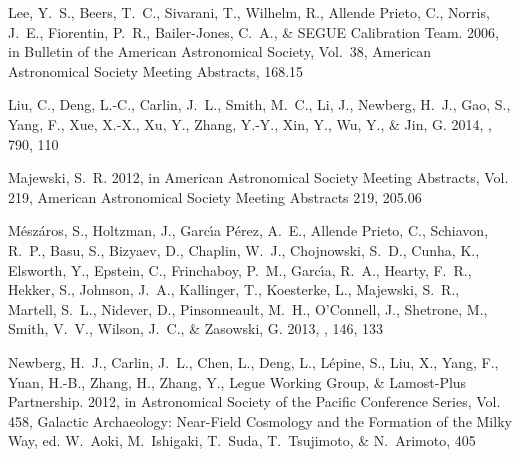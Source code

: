 \documentclass[12pt, preprint]{aastex}
\begin{document}
\begin{thebibliography}{24}
{Lee}, Y.~S., {Beers}, T.~C., {Sivarani}, T., {Wilhelm}, R., {Allende Prieto},
  C., {Norris}, J.~E., {Fiorentin}, P.~R., {Bailer-Jones}, C.~A., \& {SEGUE
  Calibration Team}. 2006, in Bulletin of the American Astronomical Society,
  Vol.~38, American Astronomical Society Meeting Abstracts, 168.15

{Liu}, C., {Deng}, L.-C., {Carlin}, J.~L., {Smith}, M.~C., {Li}, J., {Newberg},
  H.~J., {Gao}, S., {Yang}, F., {Xue}, X.-X., {Xu}, Y., {Zhang}, Y.-Y., {Xin},
  Y., {Wu}, Y., \& {Jin}, G. 2014, \apj, 790, 110

{Majewski}, S.~R. 2012, in American Astronomical Society Meeting Abstracts,
  Vol. 219, American Astronomical Society Meeting Abstracts 219, 205.06

{M{\'e}sz{\'a}ros}, S., {Holtzman}, J., {Garc{\'{\i}}a P{\'e}rez}, A.~E.,
  {Allende Prieto}, C., {Schiavon}, R.~P., {Basu}, S., {Bizyaev}, D.,
  {Chaplin}, W.~J., {Chojnowski}, S.~D., {Cunha}, K., {Elsworth}, Y.,
  {Epstein}, C., {Frinchaboy}, P.~M., {Garc{\'{\i}}a}, R.~A., {Hearty}, F.~R.,
  {Hekker}, S., {Johnson}, J.~A., {Kallinger}, T., {Koesterke}, L., {Majewski},
  S.~R., {Martell}, S.~L., {Nidever}, D., {Pinsonneault}, M.~H., {O'Connell},
  J., {Shetrone}, M., {Smith}, V.~V., {Wilson}, J.~C., \& {Zasowski}, G. 2013,
  \aj, 146, 133

{Newberg}, H.~J., {Carlin}, J.~L., {Chen}, L., {Deng}, L., {L{\'e}pine}, S.,
  {Liu}, X., {Yang}, F., {Yuan}, H.-B., {Zhang}, H., {Zhang}, Y., {Legue
  Working Group}, \& {Lamost-Plus Partnership}. 2012, in Astronomical Society
  of the Pacific Conference Series, Vol. 458, Galactic Archaeology: Near-Field
  Cosmology and the Formation of the Milky Way, ed. W.~{Aoki}, M.~{Ishigaki},
  T.~{Suda}, T.~{Tsujimoto}, \& N.~{Arimoto}, 405


\end{thebibliography}
\end{document}
